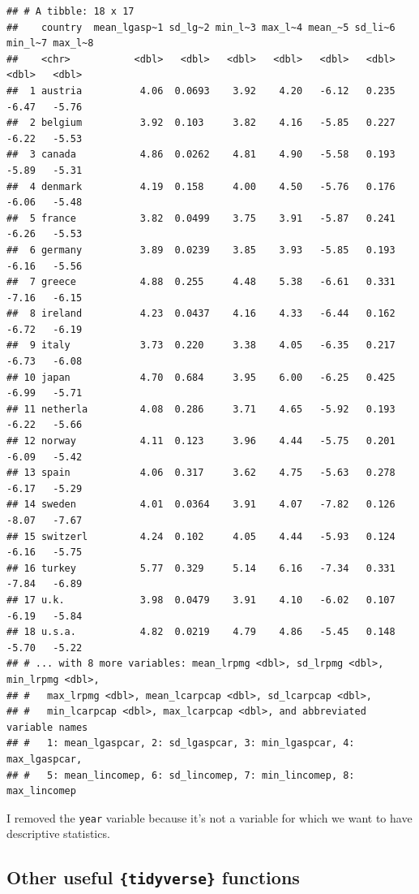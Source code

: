 \documentclass[
]{article}
\begin{document}
\begin{verbatim}
## # A tibble: 18 x 17
##    country  mean_lgasp~1 sd_lg~2 min_l~3 max_l~4 mean_~5 sd_li~6 min_l~7 max_l~8
##    <chr>           <dbl>   <dbl>   <dbl>   <dbl>   <dbl>   <dbl>   <dbl>   <dbl>
##  1 austria          4.06  0.0693    3.92    4.20   -6.12   0.235   -6.47   -5.76
##  2 belgium          3.92  0.103     3.82    4.16   -5.85   0.227   -6.22   -5.53
##  3 canada           4.86  0.0262    4.81    4.90   -5.58   0.193   -5.89   -5.31
##  4 denmark          4.19  0.158     4.00    4.50   -5.76   0.176   -6.06   -5.48
##  5 france           3.82  0.0499    3.75    3.91   -5.87   0.241   -6.26   -5.53
##  6 germany          3.89  0.0239    3.85    3.93   -5.85   0.193   -6.16   -5.56
##  7 greece           4.88  0.255     4.48    5.38   -6.61   0.331   -7.16   -6.15
##  8 ireland          4.23  0.0437    4.16    4.33   -6.44   0.162   -6.72   -6.19
##  9 italy            3.73  0.220     3.38    4.05   -6.35   0.217   -6.73   -6.08
## 10 japan            4.70  0.684     3.95    6.00   -6.25   0.425   -6.99   -5.71
## 11 netherla         4.08  0.286     3.71    4.65   -5.92   0.193   -6.22   -5.66
## 12 norway           4.11  0.123     3.96    4.44   -5.75   0.201   -6.09   -5.42
## 13 spain            4.06  0.317     3.62    4.75   -5.63   0.278   -6.17   -5.29
## 14 sweden           4.01  0.0364    3.91    4.07   -7.82   0.126   -8.07   -7.67
## 15 switzerl         4.24  0.102     4.05    4.44   -5.93   0.124   -6.16   -5.75
## 16 turkey           5.77  0.329     5.14    6.16   -7.34   0.331   -7.84   -6.89
## 17 u.k.             3.98  0.0479    3.91    4.10   -6.02   0.107   -6.19   -5.84
## 18 u.s.a.           4.82  0.0219    4.79    4.86   -5.45   0.148   -5.70   -5.22
## # ... with 8 more variables: mean_lrpmg <dbl>, sd_lrpmg <dbl>, min_lrpmg <dbl>,
## #   max_lrpmg <dbl>, mean_lcarpcap <dbl>, sd_lcarpcap <dbl>,
## #   min_lcarpcap <dbl>, max_lcarpcap <dbl>, and abbreviated variable names
## #   1: mean_lgaspcar, 2: sd_lgaspcar, 3: min_lgaspcar, 4: max_lgaspcar,
## #   5: mean_lincomep, 6: sd_lincomep, 7: min_lincomep, 8: max_lincomep
\end{verbatim}

I removed the \texttt{year} variable because it's not a variable for which we want to have descriptive
statistics.

\hypertarget{other-useful-tidyverse-functions}{%
\subsection{\texorpdfstring{Other useful \texttt{\{tidyverse\}} functions}{Other useful \{tidyverse\} functions}}\label{other-useful-tidyverse-functions}}
\end{document}
